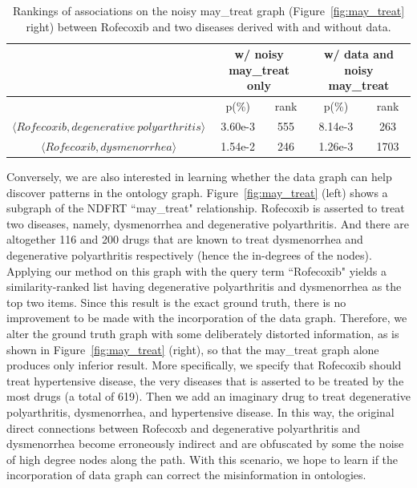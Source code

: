 \begin{table}[tbh]\scriptsize
\begin{center}
\begin{tabular}{ c || c  c || c  c }
\hline
        &   \multicolumn{2}{c||}{w/ noisy may\_treat only}    &   \multicolumn{2}{c}{w/ data and noisy may\_treat}\\
\hline
\hline
       	&   p(\%)   &   rank    &  p(\%)    &    rank    \\
\hline
$\langle Rofecoxib, degenerative~polyarthritis\rangle$       &   3.60e-3   &   555     &   8.14e-3    &   263    \\
$\langle Rofecoxib, dysmenorrhea\rangle$    &   1.54e-2   &   246     &   1.26e-3    &   1703   \\
\hline
\end{tabular}
\end{center}
\caption[Rankings of associations on the noisy may\_treat graph]{\label{tbl:salted_may_treat}Rankings of associations on the noisy may\_treat graph (Figure~\ref{fig:may_treat} right) between Rofecoxib and two diseases derived with and without data.}
\end{table}

Conversely, we are also interested in learning whether the data graph can help discover patterns in the ontology graph. Figure~\ref{fig:may_treat} (left) shows a subgraph of the NDFRT ``may\_treat" relationship. Rofecoxib is asserted to treat two diseases, namely, dysmenorrhea and degenerative polyarthritis. And there are altogether 116 and 200 drugs that are known to treat dysmenorrhea and degenerative polyarthritis respectively (hence the in-degrees of the nodes). Applying our method on this graph with the query term ``Rofecoxib" yields a similarity-ranked list having degenerative polyarthritis and dysmenorrhea as the top two items. Since this result is the exact ground truth, there is no improvement to be made with the incorporation of the data graph. Therefore, we alter the ground truth graph with some deliberately distorted information, as is shown in Figure~\ref{fig:may_treat} (right), so that the may\_treat graph alone produces only inferior result. More specifically, we specify that Rofecoxib should treat hypertensive disease, the very diseases that is asserted to be treated by the most drugs (a total of 619). Then we add an imaginary drug to treat degenerative polyarthritis, dysmenorrhea, and hypertensive disease. In this way, the original direct connections between Rofecoxb and degenerative polyarthritis and dysmenorrhea become erroneously indirect and are obfuscated by some the noise of high degree nodes along the path. With this scenario, we hope to learn if the incorporation of data graph can correct the misinformation in ontologies.

